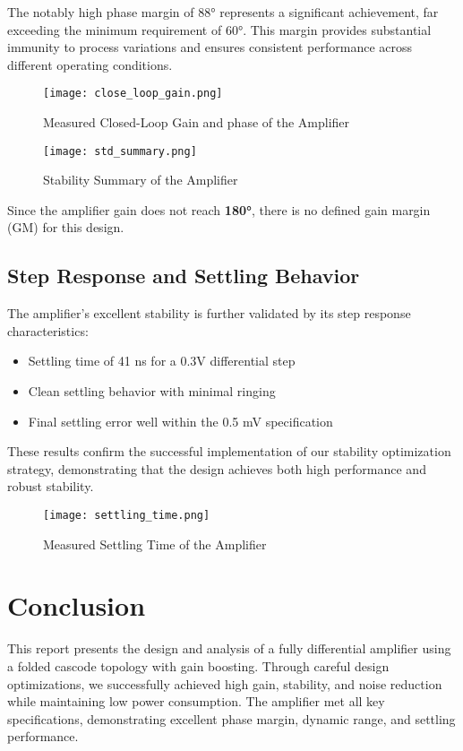 \documentclass[a4paper,12pt]{article}
\begin{document}
The notably high phase margin of 88° represents a significant achievement, far exceeding the minimum requirement of 60°. This margin provides substantial immunity to process variations and ensures consistent performance across different operating conditions.

\begin{figure}[H]
    \centering
    \texttt{[image: close\_loop\_gain.png]}
    \caption{Measured Closed-Loop Gain and phase of the Amplifier}
    \label{fig:close_loop_gain}
\end{figure}

\begin{figure}[H]
    \centering
    \texttt{[image: std\_summary.png]}
    \caption{Stability Summary of the Amplifier}
    \label{fig:stability_summary}
\end{figure}

Since the amplifier gain does not reach \textbf{180°}, there is no defined gain margin (GM) for this design.

\subsection{Step Response and Settling Behavior}
The amplifier's excellent stability is further validated by its step response characteristics:

\begin{itemize}
    \item Settling time of 41 ns for a 0.3V differential step
    \item Clean settling behavior with minimal ringing
    \item Final settling error well within the 0.5 mV specification
\end{itemize}

These results confirm the successful implementation of our stability optimization strategy, demonstrating that the design achieves both high performance and robust stability.

\begin{figure}[H]
    \centering
    \texttt{[image: settling\_time.png]}
    \caption{Measured Settling Time of the Amplifier}
    \label{fig:settling_time}
\end{figure}


\section{Conclusion}
This report presents the design and analysis of a fully differential amplifier using a folded cascode topology with gain boosting. Through careful design optimizations, we successfully achieved high gain, stability, and noise reduction while maintaining low power consumption. The amplifier met all key specifications, demonstrating excellent phase margin, dynamic range, and settling performance.
\end{document}
